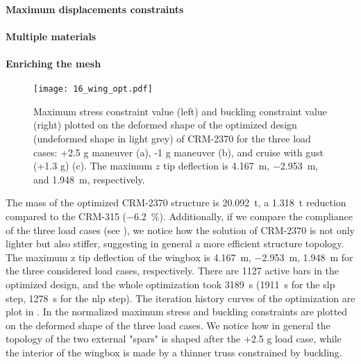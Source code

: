 \paragraph{Maximum displacements constraints}

\paragraph{Multiple materials}

\paragraph{Enriching the mesh}
\begin{figure*}
    \centering
    \texttt{[image: 16\_wing\_opt.pdf]}
     \caption{Maximum stress constraint value (left) and buckling constraint value (right) plotted on the deformed shape of the optimized design (undeformed shape in light grey) of CRM-2370 for the three load cases: +2.5 g maneuver (a), -1 g maneuver (b), and cruise with gust (+1.3 g) (c). The maximum $z$ tip deflection is \qty{4.167}{m}, \qty{-2.953}{m}, and \qty{1.948}{m}, respectively.}
    \label{fig:wing_opt}
\end{figure*}
The mass of the optimized CRM-2370 structure is \qty{20.092}{\tonne}, a \qty{1.318}{\tonne} reduction compared to the CRM-315 (\qty{-6.2}{\%}). Additionally, if we compare the compliance of the three load cases (see ), we notice how the solution of CRM-2370 is not only lighter but also stiffer, suggesting in general a more efficient structure topology. The maximum z tip deflection of the wingbox is \qty{4.167}{m}, \qty{-2.953}{m}, \qty{1.948}{m} for the three considered load cases, respectively. There are 1127 active bars in the optimized design, and the whole optimization took \qty{3189}{s} (\qty{1911}{s} for the \gls{slp} step, \qty{1278}{s} for the \gls{nlp} step). The iteration history curves of the optimization are plot in . In  the normalized maximum stress and buckling constraints are plotted on the deformed shape of the three load cases. We notice how in general the topology of the two external "spars" is shaped after the +2.5 g load case, while the interior of the wingbox is made by a thinner truss constrained by buckling. 

